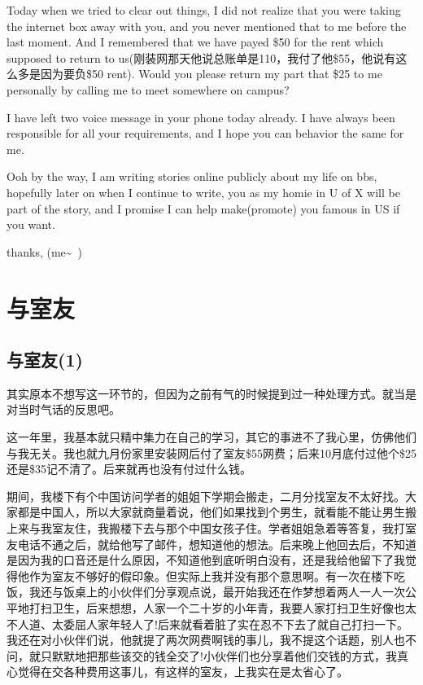 \documentclass[12pt]{book}
\begin{document}
Today when we tried to clear out things, I did not realize that you were taking the internet box away with you, and you never mentioned that to me before the last moment. And I remembered that we have payed \$50 for the rent which supposed to return to us(刚装网那天他说总账单是110，我付了他\$55，他说有这么多是因为要负\$50 rent). Would you please return my part that \$25 to me personally by calling me to meet somewhere on campus?

I have left two voice message in your phone today already. I have always been responsible for all your requirements, and I hope you can behavior the same for me. 

Ooh by the way, I am writing stories online publicly about my life on bbs, hopefully later on when I continue to write, you as my homie in U of X will be part of the story, and I promise I can help make(promote) you famous in US if you want. 

thanks,
(me\textasciitilde{}~)

\chapter{与室友}
\label{sec-17}
\section{与室友(1)}
\label{sec-17-1}

其实原本不想写这一环节的，但因为之前有气的时候提到过一种处理方式。就当是对当时气话的反思吧。

这一年里，我基本就只精中集力在自己的学习，其它的事进不了我心里，仿佛他们与我无关。我也就九月份家里安装网后付了室友\$55网费；后来10月底付过他个\$25还是\$35记不清了。后来就再也没有付过什么钱。

期间，我楼下有个中国访问学者的姐姐下学期会搬走，二月分找室友不太好找。大家都是中国人，所以大家就商量着说，他们如果找到个男生，就看能不能让男生搬上来与我室友住，我搬楼下去与那个中国女孩子住。学者姐姐急着等答复，我打室友电话不通之后，就给他写了邮件，想知道他的想法。后来晚上他回去后，不知道是因为我的口音还是什么原因，不知道他到底听明白没有，还是我给他留下了我觉得他作为室友不够好的假印象。但实际上我并没有那个意思啊。有一次在楼下吃饭，我还与饭桌上的小伙伴们分享观点说，最开始我还在作梦想着两人一人一次公平地打扫卫生，后来想想，人家一个二十岁的小年青，我要人家打扫卫生好像也太不人道、太委屈人家年轻人了!后来就看着脏了实在忍不下去了就自己打扫一下。我还在对小伙伴们说，他就提了两次网费啊钱的事儿，我不提这个话题，别人也不问，就只默默地把那些该交的钱全交了!小伙伴们也分享着他们交钱的方式，我真心觉得在交各种费用这事儿，有这样的室友，上我实在是太省心了。
\end{document}
